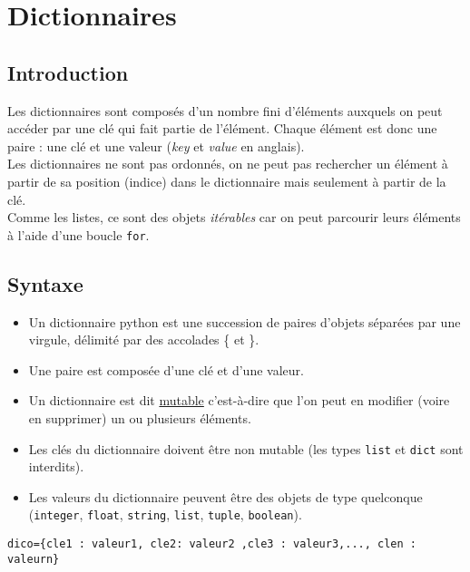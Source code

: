 \setchapterpreamble[u]{\margintoc}

\chapter{Dictionnaires}



\section{Introduction}

Les dictionnaires sont composés d'un nombre fini d'éléments auxquels on peut accéder par une clé qui fait partie de l'élément.
Chaque élément est donc une paire : une clé et une valeur (\textit{key} et \textit{value} en anglais).\\
Les dictionnaires ne sont pas ordonnés, on ne peut pas rechercher un élément à partir de sa position (indice) dans le dictionnaire mais seulement à partir de la clé.\\
Comme les listes, ce sont des objets \textit{itérables} car on peut parcourir leurs éléments à l'aide d'une boucle \texttt{for}.


\section{Syntaxe}

\begin{itemize}
\item Un dictionnaire python est une succession de paires d'objets séparées par une virgule, délimité par des accolades \{ et \}.
\item Une paire est composée d'une clé et d'une valeur.%
\item Un dictionnaire est dit \underline{mutable} c'est-à-dire que l'on peut en modifier (voire en supprimer) un ou plusieurs éléments.
\item Les clés du dictionnaire doivent être non mutable (les types \texttt{list} et \texttt{dict} sont interdits).
\item Les valeurs du dictionnaire peuvent être des objets de type quelconque (\texttt{integer}, \texttt{float}, \texttt{string}, \texttt{list}, \texttt{tuple}, \texttt{boolean}).
\end{itemize}

\begin{center}
\texttt{dico=\{cle1 : valeur1, cle2: valeur2  ,cle3 : valeur3,..., clen : valeurn\}}
\end{center}

